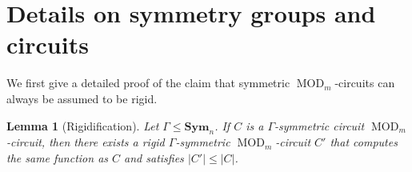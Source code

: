 \documentclass[11pt]{article}
\DeclareMathOperator{\MOD}{MOD}
\newcommand{\Sym}{\mathbf{Sym}}
\theoremstyle{definition}
\theoremstyle{plain}
\newtheorem{lemma}[definition]{Lemma}
\theoremstyle{remark}
\theoremstyle{remark}
\begin{document}
  








\printbibliography

\newpage

\appendix 



\section{Details on symmetry groups and circuits}
\label{sec:appendixGroups}

We first give a detailed proof of the claim that symmetric $\MOD_m$-circuits can always be assumed to be rigid.

\begin{lemma}[Rigidification]
	\label{lem:rigidification}
	Let $\Gamma \leq \Sym_n$.
	If $C$ is a $\Gamma$-symmetric circuit $\MOD_m$-circuit, then there exists a rigid $\Gamma$-symmetric $\MOD_m$-circuit $C'$ that computes the same function as $C$ and satisfies $|C'| \leq |C|$.
\end{lemma}	
\end{document}
